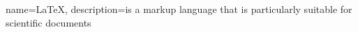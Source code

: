 \makenoidxglossaries


{
  name=LaTeX,
  description={is a markup language that is particularly suitable for scientific documents}
}



